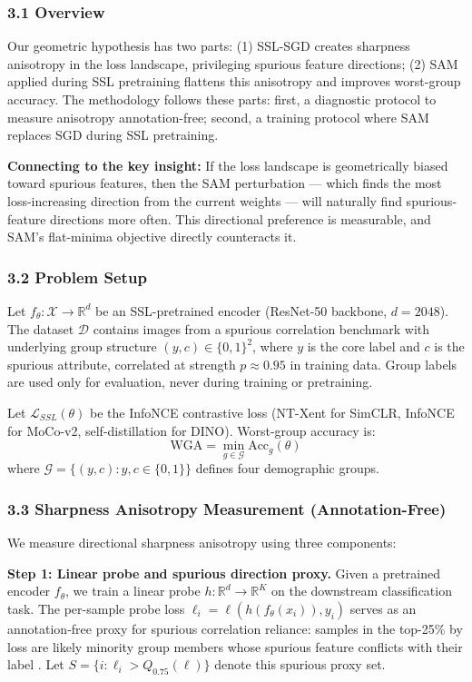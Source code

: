 
\subsubsection{3.1 Overview}

Our geometric hypothesis has two parts: (1) SSL-SGD creates sharpness anisotropy in the loss landscape, privileging spurious feature directions; (2) SAM applied during SSL pretraining flattens this anisotropy and improves worst-group accuracy. The methodology follows these parts: first, a diagnostic protocol to measure anisotropy annotation-free; second, a training protocol where SAM replaces SGD during SSL pretraining.

\textbf{Connecting to the key insight:} If the loss landscape is geometrically biased toward spurious features, then the SAM perturbation --- which finds the most loss-increasing direction from the current weights --- will naturally find spurious-feature directions more often. This directional preference is measurable, and SAM's flat-minima objective directly counteracts it.

\subsubsection{3.2 Problem Setup}

Let $f_\theta: \mathcal{X} \to \mathbb{R}^d$ be an SSL-pretrained encoder (ResNet-50 backbone, $d=2048$). The dataset $\mathcal{D}$ contains images from a spurious correlation benchmark with underlying group structure $(y, c) \in \{0,1\}^2$, where $y$ is the core label and $c$ is the spurious attribute, correlated at strength $p \approx 0.95$ in training data. Group labels are used only for evaluation, never during training or pretraining.

Let $\mathcal{L}_{SSL}(\theta)$ be the InfoNCE contrastive loss (NT-Xent for SimCLR, InfoNCE for MoCo-v2, self-distillation for DINO). Worst-group accuracy is:
$$\text{WGA} = \min_{g \in \mathcal{G}} \text{Acc}_g(\theta)$$
where $\mathcal{G} = \{(y,c) : y,c \in \{0,1\}\}$ defines four demographic groups.

\subsubsection{3.3 Sharpness Anisotropy Measurement (Annotation-Free)}

We measure directional sharpness anisotropy using three components:

\textbf{Step 1: Linear probe and spurious direction proxy.}
Given a pretrained encoder $f_\theta$, we train a linear probe $h: \mathbb{R}^d \to \mathbb{R}^K$ on the downstream classification task. The per-sample probe loss $\ell_i = \ell(h(f_\theta(x_i)), y_i)$ serves as an annotation-free proxy for spurious correlation reliance: samples in the top-25\% by loss are likely minority group members whose spurious feature conflicts with their label \citep{ghaznavi2023lfr}. Let $S = \{i : \ell_i > Q_{0.75}(\ell)\}$ denote this spurious proxy set.

